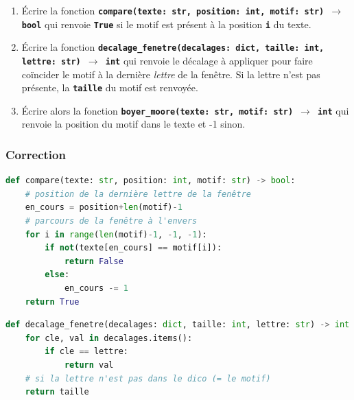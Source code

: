 \documentclass[svgnames,11pt]{beamer}
\begin{document}
\begin{frame}
    \frametitle{}

    \begin{activite}
        \begin{enumerate}
            \item Écrire la fonction \textbf{\texttt{compare(texte: str, position: int, motif: str) $\rightarrow$ bool}} qui renvoie \texttt{\textbf{True}} si le motif est présent à la position \textbf{\texttt{i}} du texte.
            \item Écrire la fonction \textbf{\texttt{decalage\_fenetre(decalages: dict, taille: int, lettre: str) $\rightarrow$ int}} qui renvoie le décalage à appliquer pour faire coïncider le motif à la dernière \emph{lettre} de la fenêtre. Si la lettre n'est pas présente, la \texttt{\textbf{taille}} du motif est renvoyée.
            \item Écrire alors la fonction \textbf{\texttt{boyer\_moore(texte: str, motif: str) $\rightarrow$ int}} qui renvoie la position du motif dans le texte et -1 sinon.
        \end{enumerate}
    \end{activite}

\end{frame}
\begin{frame}[fragile]
    \frametitle{Correction}

\begin{center}
\begin{lstlisting}[language=Python , basicstyle=\ttfamily\small, xleftmargin=0.2em, xrightmargin=0em]
def compare(texte: str, position: int, motif: str) -> bool:
    # position de la dernière lettre de la fenêtre
    en_cours = position+len(motif)-1
    # parcours de la fenêtre à l'envers
    for i in range(len(motif)-1, -1, -1):
        if not(texte[en_cours] == motif[i]):
            return False
        else:
            en_cours -= 1
    return True
\end{lstlisting}
\end{center}

\end{frame}
\begin{frame}[fragile]
\begin{center}
\begin{lstlisting}[language=Python , basicstyle=\ttfamily\small, xleftmargin=0.2em, xrightmargin=0em]
def decalage_fenetre(decalages: dict, taille: int, lettre: str) -> int:
    for cle, val in decalages.items():
        if cle == lettre:
            return val
    # si la lettre n'est pas dans le dico (= le motif)
    return taille
\end{lstlisting}
\end{center}

\end{frame}
\end{document}
